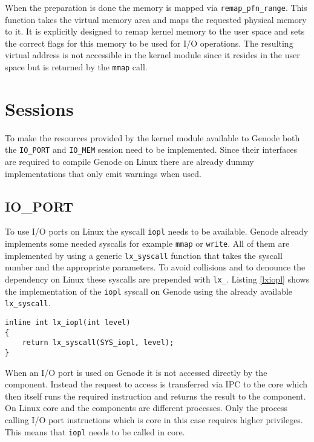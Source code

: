 \documentclass[
a4paper,
12pt,
notitlepage,
parskip=half,
DIV=11,
]{scrbook}
\begin{document}
		When the preparation is done the memory is mapped via \texttt{remap\_pfn\_range}.
		This function takes the virtual memory area and maps the requested physical memory to it.
		It is explicitly designed to remap kernel memory to the user space and sets the correct flags for this memory to be used for I/O operations.
		The resulting virtual address is not accessible in the kernel module since it resides in the user space but is returned by the \texttt{mmap} call.
		
		\section{Sessions}
		
		To make the resources provided by the kernel module available to Genode both the \texttt{IO\_PORT} and \texttt{IO\_MEM} session need to be implemented.
		Since their interfaces are required to compile Genode on Linux there are already dummy implementations that only emit warnings when used.
		
		\subsection{IO\_PORT}
		
		To use I/O ports on Linux the syscall \texttt{iopl} \citep{iopl} needs to be available.
		Genode already implements some needed syscalls for example \texttt{mmap} or \texttt{write}.
		All of them are implemented by using a generic \texttt{lx\_syscall} function that takes the syscall number and the appropriate parameters.
		To avoid collisions and to denounce the dependency on Linux these syscalls are prepended with \texttt{lx\_}.
		Listing \ref{lxiopl} shows the implementation of the \texttt{iopl} syscall on Genode using the already available \texttt{lx\_syscall}.
		
		\begin{lstlisting}[basicstyle=\ttfamily\footnotesize]
inline int lx_iopl(int level)
{
	return lx_syscall(SYS_iopl, level);
}
		\end{lstlisting}
		
		When an I/O port is used on Genode it is not accessed directly by the component.
		Instead the request to access is transferred via IPC to the core which then itself runs the required instruction and returns the result to the component.
		On Linux core and the components are different processes.
		Only the process calling I/O port instructions which is core in this case requires higher privileges.
		This means that \texttt{iopl} needs to be called in core.
		
\end{document}
